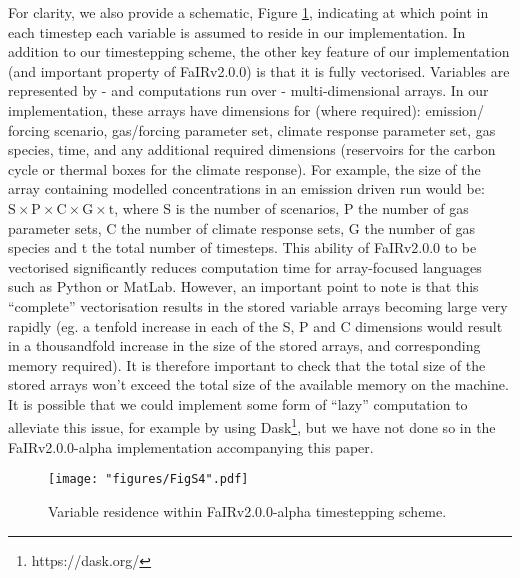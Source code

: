 \documentclass[gmd, manuscript]{copernicus}
\begin{document}
For clarity, we also provide a schematic, Figure \ref{fig:implementation}, indicating at which point in each timestep each variable is assumed to reside in our implementation. In addition to our timestepping scheme, the other key feature of our implementation (and important property of FaIRv2.0.0) is that it is fully vectorised. Variables are represented by - and computations run over - multi-dimensional arrays. In our implementation, these arrays have dimensions for (where required): emission/ forcing scenario, gas/forcing parameter set, climate response parameter set, gas species, time, and any additional required dimensions (reservoirs for the carbon cycle or thermal boxes for the climate response). For example, the size of the array containing modelled concentrations in an emission driven run would be: $\text{S}\times\text{P}\times\text{C}\times\text{G}\times\text{t}$, where S is the number of scenarios, P the number of gas parameter sets, C the number of climate response sets, G the number of gas species and t the total number of timesteps. This ability of FaIRv2.0.0 to be vectorised significantly reduces computation time for array-focused languages such as Python or MatLab. However, an important point to note is that this “complete” vectorisation results in the stored variable arrays becoming large very rapidly (eg. a tenfold increase in each of the S, P and C dimensions would result in a thousandfold increase in the size of the stored arrays, and corresponding memory required). It is therefore important to check that the total size of the stored arrays won’t exceed the total size of the available memory on the machine. It is possible that we could implement some form of “lazy” computation to alleviate this issue, for example by using Dask\footnote{https://dask.org/}, but we have not done so in the FaIRv2.0.0-alpha implementation accompanying this paper.
%
\begin{figure}[h]
    \texttt{[image: "figures/FigS4".pdf]}
    \caption{Variable residence within FaIRv2.0.0-alpha timestepping scheme.}
    \label{fig:implementation}
\end{figure}
\clearpage
%


\end{document}
